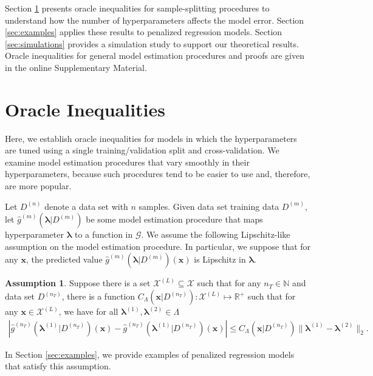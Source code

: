 \documentclass[12pt]{article} %
\theoremstyle{definition}
\newtheorem{assump}{Assumption}
\begin{document}
Section \ref{sec:main_results} presents oracle inequalities for sample-splitting procedures to understand how the number of hyperparameters affects the model error.
Section \ref{sec:examples} applies these results to penalized regression models.
Section \ref{sec:simulations} provides a simulation study to support our theoretical results.
Oracle inequalities for general model estimation procedures and proofs are given in the online Supplementary Material.



\section{Oracle Inequalities} \label{sec:main_results}

Here, we establish oracle inequalities for models in which the hyperparameters are tuned using a single training/validation split and cross-validation.
We examine model estimation procedures that vary smoothly in their hyperparameters, because such procedures tend to be easier to use and, therefore, are more popular.

Let $D^{(n)}$ denote a data set with $n$ samples.
Given data set training data $D^{(m)}$, let $\hat{g}^{(m)}(\boldsymbol{\lambda} | D^{(m)})$ be some model estimation procedure that maps hyperparameter $\boldsymbol{\lambda}$ to a function in $\mathcal{G}$.
We assume the following Lipschitz-like assumption on the model estimation procedure.
In particular, we suppose that for any $\boldsymbol{x}$, the predicted value $\hat{g}^{(m)}(\boldsymbol{\lambda} | D^{(m)})(\boldsymbol{x})$ is Lipschitz in $\boldsymbol{\lambda}$.
\begin{assump}
	\label{assump:lipschitz}
	Suppose there is a set $\mathcal{X}^{(L)} \subseteq \mathcal{X}$ such that for any $n_T \in \mathbb{N}$ and data set $D^{(n_T)}$, there is a function $C_\Lambda(\boldsymbol{x} | D^{(n_T)}) : \mathcal{X}^{(L)} \mapsto \mathbb{R}^+$ such that for any $\boldsymbol{x} \in \mathcal{X}^{(L)}$, we have for all $\boldsymbol{\lambda}^{(1)}, \boldsymbol{\lambda}^{(2)} \in \Lambda$
	\begin{align}
	\left |
	\hat{g}^{(n_T)}(\boldsymbol{\lambda}^{(1)}|D^{(n_T)})(\boldsymbol{x}) - \hat{g}^{(n_T)}(\boldsymbol{\lambda}^{(1)}|D^{(n_T)})(\boldsymbol{x}) \right |
	\le C_\Lambda(\boldsymbol{x}|D^{(n_T)}) \|\boldsymbol{\lambda}^{(1)} - \boldsymbol{\lambda}^{(2)}\|_2.
	\end{align}
\end{assump}
\noindent In Section \ref{sec:examples}, we provide examples of penalized regression models that satisfy this assumption.
\end{document}
